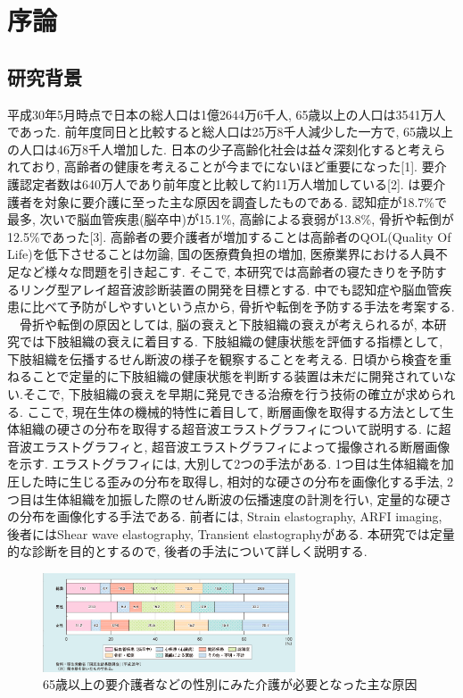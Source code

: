 \chapter{序論}
\newpage
\section{研究背景}
 平成30年5月時点で日本の総人口は1億2644万6千人, 65歳以上の人口は3541万人であった. 前年度同日と比較すると総人口は25万8千人減少した一方で, 65歳以上の人口は46万8千人増加した. 日本の少子高齢化社会は益々深刻化すると考えられており, 高齢者の健康を考えることが今までにないほど重要になった[1]. 要介護認定者数は640万人であり前年度と比較して約11万人増加している[2]. は要介護者を対象に要介護に至った主な原因を調査したものである. 認知症が18.7\%で最多, 次いで脳血管疾患(脳卒中)が15.1\%, 高齢による衰弱が13.8\%, 骨折や転倒が12.5\%であった[3]. 高齢者の要介護者が増加することは高齢者のQOL(Quality Of Life)を低下させることは勿論, 国の医療費負担の増加, 医療業界における人員不足など様々な問題を引き起こす. そこで, 本研究では高齢者の寝たきりを予防するリング型アレイ超音波診断装置の開発を目標とする. 中でも認知症や脳血管疾患に比べて予防がしやすいという点から, 骨折や転倒を予防する手法を考案する. 
\\\ \ 骨折や転倒の原因としては, 脳の衰えと下肢組織の衰えが考えられるが, 本研究では下肢組織の衰えに着目する. 下肢組織の健康状態を評価する指標として, 下肢組織を伝播するせん断波の様子を観察することを考える. 日頃から検査を重ねることで定量的に下肢組織の健康状態を判断する装置は未だに開発されていない.そこで, 下肢組織の衰えを早期に発見できる治療を行う技術の確立が求められる. ここで, 現在生体の機械的特性に着目して, 断層画像を取得する方法として生体組織の硬さの分布を取得する超音波エラストグラフィについて説明する.  に超音波エラストグラフィと, 超音波エラストグラフィによって撮像される断層画像を示す. エラストグラフィには, 大別して2つの手法がある. 1つ目は生体組織を加圧した時に生じる歪みの分布を取得し,  相対的な硬さの分布を画像化する手法, 2つ目は生体組織を加振した際のせん断波の伝播速度の計測を行い, 定量的な硬さの分布を画像化する手法である. 前者には, Strain elastography, ARFI imaging, 後者にはShear wave elastography, Transient elastographyがある. 本研究では定量的な診断を目的とするので, 後者の手法について詳しく説明する. 
\begin{figure}[h]
  \begin{center}
    \includegraphics[width=75mm]{fig/kaigo.jpg}
  \end{center}
  \caption{65歳以上の要介護者などの性別にみた介護が必要となった主な原因}
\end{figure}
